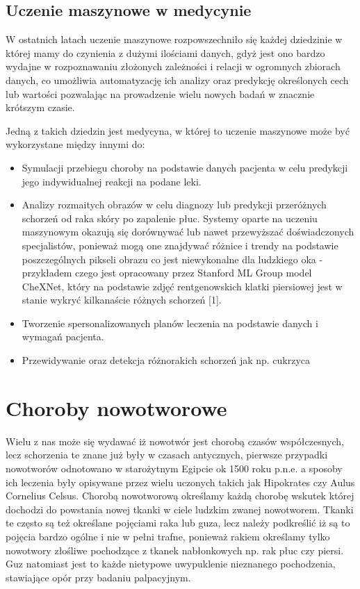 \documentclass[a4paper,12pt,oneside]{book}
\begin{document}
\section{Uczenie maszynowe w medycynie}
W ostatnich latach uczenie maszynowe rozpowszechniło się każdej dziedzinie w której mamy do czynienia z dużymi ilościami danych, gdyż jest ono bardzo wydajne w rozpoznawaniu złożonych zależności i relacji w ogromnych zbiorach danych, co umożliwia automatyzację ich analizy oraz predykcję określonych cech lub wartości pozwalając na prowadzenie wielu nowych badań w znacznie krótszym czasie.\par
Jedną z takich dziedzin jest medycyna, w której to uczenie maszynowe może być wykorzystane między innymi do:
\begin{itemize}
  \item Symulacji przebiegu choroby na podstawie danych pacjenta w celu predykcji jego indywidualnej reakcji na podane leki.
  \item Analizy rozmaitych obrazów w celu diagnozy lub predykcji przeróżnych schorzeń od raka skóry po zapalenie płuc. Systemy oparte na uczeniu maszynowym okazują się dorównywać lub nawet przewyższać doświadczonych specjalistów, ponieważ mogą one znajdywać różnice i trendy na podstawie poszczególnych pikseli obrazu co jest niewykonalne dla ludzkiego oka - przykładem czego jest opracowany przez Stanford ML Group model CheXNet, który na podstawie zdjęć rentgenowskich klatki piersiowej jest w stanie wykryć kilkanaście różnych schorzeń [1]. 
  \item Tworzenie spersonalizowanych planów leczenia na podstawie danych i wymagań pacjenta.
  \item Przewidywanie oraz detekcja różnorakich schorzeń jak np. cukrzyca
\end{itemize}




\chapter{Choroby nowotworowe}
Wielu z nas może się wydawać iż nowotwór jest chorobą czasów  współczesnych, lecz  schorzenia te znane już były w czasach antycznych, pierwsze przypadki nowotworów odnotowano w starożytnym Egipcie ok 1500 roku p.n.e. a sposoby ich leczenia były opisywane przez wielu uczonych takich jak Hipokrates czy Aulus Cornelius Celsus.
Chorobą nowotworową określamy każdą chorobę wskutek której dochodzi do powstania  nowej tkanki w ciele ludzkim zwanej nowotworem. Tkanki te często są też określane pojęciami raka lub guza, lecz należy podkreślić iż są to pojęcia bardzo ogólne i nie w pełni trafne, ponieważ rakiem określamy tylko nowotwory złośliwe pochodzące z tkanek nabłonkowych np. rak płuc czy piersi. Guz natomiast jest to każde nietypowe uwypuklenie nieznanego pochodzenia, stawiające opór przy badaniu palpacyjnym.
\end{document}
